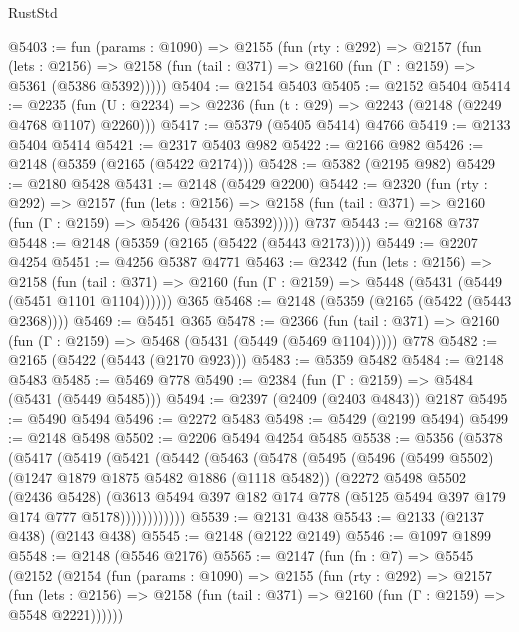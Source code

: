 \begin{lexlean}{RustStd}
\begin{coremodule}
@5403 := fun (params : @1090) =>
  @2155
    (fun (rty : @292) =>
    @2157
      (fun (lets : @2156) =>
      @2158 (fun (tail : @371) => @2160 (fun (Γ : @2159) => @5361 (@5386 @5392)))))
@5404 := @2154 @5403
@5405 := @2152 @5404
@5414 := @2235 (fun (U : @2234) => @2236 (fun (t : @29) => @2243 (@2148 (@2249 @4768 @1107) @2260)))
@5417 := @5379 (@5405 @5414) @4766
@5419 := @2133 @5404 @5414
@5421 := @2317 @5403 @982
@5422 := @2166 @982
@5426 := @2148 (@5359 (@2165 (@5422 @2174)))
@5428 := @5382 (@2195 @982)
@5429 := @2180 @5428
@5431 := @2148 (@5429 @2200)
@5442 := @2320
    (fun (rty : @292) =>
    @2157
      (fun (lets : @2156) =>
      @2158 (fun (tail : @371) => @2160 (fun (Γ : @2159) => @5426 (@5431 @5392)))))
    @737
@5443 := @2168 @737
@5448 := @2148 (@5359 (@2165 (@5422 (@5443 @2173))))
@5449 := @2207 @4254
@5451 := @4256 @5387 @4771
@5463 := @2342
    (fun (lets : @2156) =>
    @2158
      (fun (tail : @371) => @2160 (fun (Γ : @2159) => @5448 (@5431 (@5449 (@5451 @1101 @1104))))))
    @365
@5468 := @2148 (@5359 (@2165 (@5422 (@5443 @2368))))
@5469 := @5451 @365
@5478 := @2366
    (fun (tail : @371) => @2160 (fun (Γ : @2159) => @5468 (@5431 (@5449 (@5469 @1104)))))
    @778
@5482 := @2165 (@5422 (@5443 (@2170 @923)))
@5483 := @5359 @5482
@5484 := @2148 @5483
@5485 := @5469 @778
@5490 := @2384 (fun (Γ : @2159) => @5484 (@5431 (@5449 @5485)))
@5494 := @2397 (@2409 (@2403 @4843)) @2187
@5495 := @5490 @5494
@5496 := @2272 @5483
@5498 := @5429 (@2199 @5494)
@5499 := @2148 @5498
@5502 := @2206 @5494 @4254 @5485
@5538 := @5356
    (@5378
      (@5417
        (@5419
          (@5421
            (@5442
              (@5463
                (@5478
                  (@5495
                    (@5496
                      (@5499 @5502)
                      (@1247 @1879 @1875 @5482 @1886 (@1118 @5482))
                      (@2272
                        @5498
                        @5502
                        (@2436 @5428)
                        (@3613
                          @5494
                          @397
                          @182
                          @174
                          @778
                          (@5125 @5494 @397 @179 @174 @777 @5178))))))))))))
@5539 := @2131 @438
@5543 := @2133 (@2137 @438) (@2143 @438)
@5545 := @2148 (@2122 @2149)
@5546 := @1097 @1899
@5548 := @2148 (@5546 @2176)
@5565 := @2147
    (fun (fn : @7) =>
    @5545
      (@2152
        (@2154
          (fun (params : @1090) =>
          @2155
            (fun (rty : @292) =>
            @2157
              (fun (lets : @2156) =>
              @2158 (fun (tail : @371) => @2160 (fun (Γ : @2159) => @5548 @2221))))))

\end{coremodule}
\end{lexlean}
